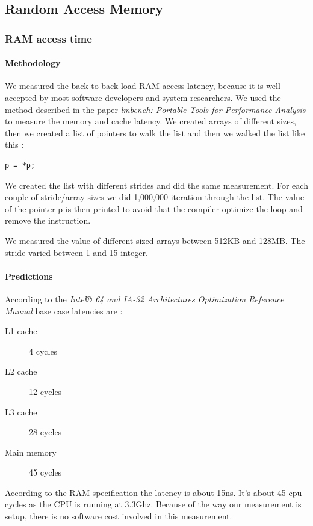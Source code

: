 \newpage
\subsection{Random Access Memory}

\subsubsection{RAM access time}
\paragraph{Methodology}
We measured the back-to-back-load RAM access latency, because it is well accepted by most software developers and system researchers.
We used the method described in the paper \emph{lmbench: Portable Tools for Performance Analysis} to measure the memory and cache latency.
We created arrays of different sizes, then we created a list of pointers to walk
the list and then we walked the list like this :
\begin{verbatim}
p = *p;
\end{verbatim}

We created the list with different strides and did the same measurement.
For each couple of stride/array sizes we did 1,000,000 iteration through the list.
The value of the pointer p is then printed to avoid that the compiler optimize the loop and remove the instruction.

We measured the value of different sized arrays between 512KB and 128MB.
The stride varied between 1 and 15 integer.

\paragraph{Predictions}
According to the \emph{Intel® 64 and IA-32 Architectures Optimization Reference Manual}
\cite{intel-archi-opti-intel64} base case latencies are :
\begin{description}
\item[L1 cache] 4 cycles
\item[L2 cache] 12 cycles
\item[L3 cache] 28 cycles
\item[Main memory] 45 cycles
\end{description}
According to the RAM specification the latency is about 15ns.
It's about 45 cpu cycles as the CPU is running at 3.3Ghz.
Because of the way our measurement is setup, there is no
software cost involved in this measurement.


